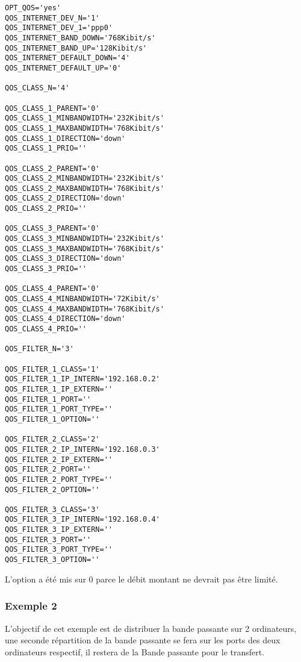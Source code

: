 \begin{small}
\begin{example}
\begin{verbatim}
OPT_QOS='yes'
QOS_INTERNET_DEV_N='1'
QOS_INTERNET_DEV_1='ppp0'
QOS_INTERNET_BAND_DOWN='768Kibit/s'
QOS_INTERNET_BAND_UP='128Kibit/s'
QOS_INTERNET_DEFAULT_DOWN='4'
QOS_INTERNET_DEFAULT_UP='0'

QOS_CLASS_N='4'

QOS_CLASS_1_PARENT='0'
QOS_CLASS_1_MINBANDWIDTH='232Kibit/s'
QOS_CLASS_1_MAXBANDWIDTH='768Kibit/s'
QOS_CLASS_1_DIRECTION='down'
QOS_CLASS_1_PRIO=''

QOS_CLASS_2_PARENT='0'
QOS_CLASS_2_MINBANDWIDTH='232Kibit/s'
QOS_CLASS_2_MAXBANDWIDTH='768Kibit/s'
QOS_CLASS_2_DIRECTION='down'
QOS_CLASS_2_PRIO=''

QOS_CLASS_3_PARENT='0'
QOS_CLASS_3_MINBANDWIDTH='232Kibit/s'
QOS_CLASS_3_MAXBANDWIDTH='768Kibit/s'
QOS_CLASS_3_DIRECTION='down'
QOS_CLASS_3_PRIO=''

QOS_CLASS_4_PARENT='0'
QOS_CLASS_4_MINBANDWIDTH='72Kibit/s'
QOS_CLASS_4_MAXBANDWIDTH='768Kibit/s'
QOS_CLASS_4_DIRECTION='down'
QOS_CLASS_4_PRIO=''

QOS_FILTER_N='3'

QOS_FILTER_1_CLASS='1'
QOS_FILTER_1_IP_INTERN='192.168.0.2'
QOS_FILTER_1_IP_EXTERN=''
QOS_FILTER_1_PORT=''
QOS_FILTER_1_PORT_TYPE=''
QOS_FILTER_1_OPTION=''

QOS_FILTER_2_CLASS='2'
QOS_FILTER_2_IP_INTERN='192.168.0.3'
QOS_FILTER_2_IP_EXTERN=''
QOS_FILTER_2_PORT=''
QOS_FILTER_2_PORT_TYPE=''
QOS_FILTER_2_OPTION=''

QOS_FILTER_3_CLASS='3'
QOS_FILTER_3_IP_INTERN='192.168.0.4'
QOS_FILTER_3_IP_EXTERN=''
QOS_FILTER_3_PORT=''
QOS_FILTER_3_PORT_TYPE=''
QOS_FILTER_3_OPTION=''
\end{verbatim}
\end{example}
\end{small}

    L'option  a été mis sur 0 parce
    le débit montant ne devrait pas être limité.



\subsubsection{Exemple 2}



    L'objectif de cet exemple est de distribuer la bande passante sur 2
    ordinateurs, une seconde répartition de la bande passante se fera
    sur les ports des deux ordinateurs respectif, il restera de la Bande
    passante pour le transfert.

